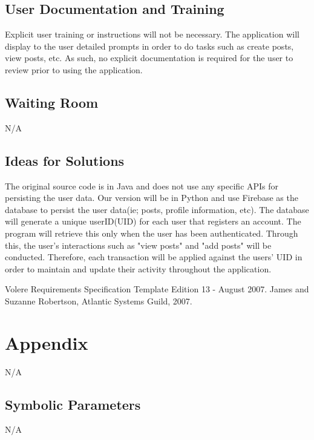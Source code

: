 \documentclass[12pt, titlepage]{article}
\begin{document}
\subsection{User Documentation and Training}
Explicit user training or instructions will not be necessary. The application will display to the user detailed prompts in order to do tasks such as create posts, view posts, etc. As such, no explicit documentation is required for the user to review prior to using the application.

\subsection{Waiting Room}
N/A

\subsection{Ideas for Solutions}
The original source code is in Java and does not use any specific APIs for persisting the user data. Our version will be in Python and use Firebase as the database to persist the user data(ie; posts, profile information, etc). The database will generate a unique userID(UID) for each user that registers an account. The program will retrieve this only when the user has been authenticated. Through this, the user's interactions such as "view posts" and "add posts" will be conducted. Therefore, each transaction will be applied against the users' UID in order to maintain and update their activity throughout the application.

\newpage



\begin{thebibliography}{9}
Volere Requirements Specification Template Edition 13 - August 2007. 
James and Suzanne Robertson, Atlantic Systems Guild, 2007.

\end{thebibliography}


\newpage


\section{Appendix}
N/A

\subsection{Symbolic Parameters}

N/A
\end{document}
